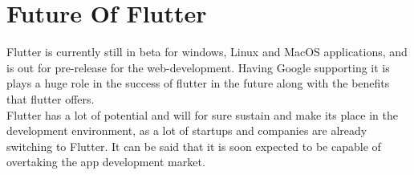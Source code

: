 \chapter{Future Of Flutter}

Flutter is currently still in beta for windows, Linux and MacOS applications, and is out for pre-release for the web-development. Having Google supporting it is plays a huge role in the success of flutter in the future along with the benefits that flutter offers.\\
	Flutter has a lot of potential and will for sure sustain and make its place in the development environment, as a lot of startups and companies are already switching to Flutter. It can be said that it is soon expected to be capable of overtaking the app development market.